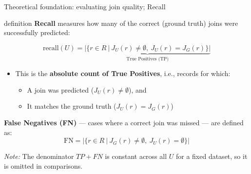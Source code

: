 \documentclass[8pt]{beamer} %
\begin{document}
\begin{frame}{Theoretical foundation: evaluating join quality; Recall}
	
	\begin{beamercolorbox}[rounded=true, shadow=true, leftskip=1em, rightskip=1em]{definition}
		\textbf{Recall} measures how many of the correct (ground truth) joins were successfully predicted:
		
		$$
		\text{recall}(U) =
		\underbrace{|\{ r \in R\ |\ J_U(r) \neq \emptyset,\ J_U(r) = J_G(r) \}|}_{\text{True Positives (TP)}}
		$$
	\end{beamercolorbox}
	
	\vspace{1em}
	
	\begin{itemize}
		\item This is the \textbf{absolute count of True Positives}, i.e., records for which:
		\begin{itemize}
			\item A join was predicted ($J_U(r) \neq \emptyset$), and
			\item It matches the ground truth ($J_U(r) = J_G(r)$)
		\end{itemize}
	\end{itemize}
	
	\vspace{0.5em}
	\textbf{False Negatives (FN)} — cases where a correct join was missed — are defined as:
	$$
	\text{FN} = |\{ r \in R\ |\ J_G(r) \neq \emptyset,\ J_U(r) = \emptyset \}|
	$$
	
	\textit{Note:} The denominator $TP + FN$ is constant across all $U$ for a fixed dataset, so it is omitted in comparisons.
	
\end{frame}
\end{document}
